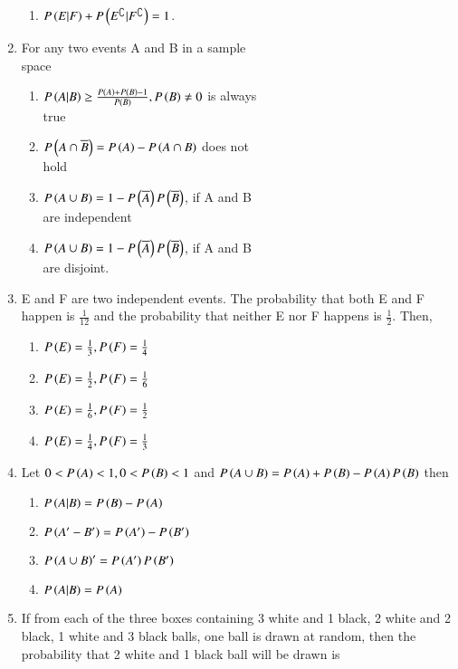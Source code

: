 \documentclass[journal,12pt,twocolumn,article]{IEEEtran}
\theoremstyle{remark}
\begin{document}
\begin{enumerate}[start = 3]
\begin{enumerate}
\item $P\left(E|F\right)+P\left(E^\complement|F^\complement\right)=1$.
\end{enumerate}
\item For any two events A and B in a sample \\space
\hfill{}
\begin{enumerate}
\item $P\left(A|B\right)\geq \frac{P\left(A\right)+P\left(B\right)-1}{P\left(B\right)}, P\left(B\right)\neq 0$ is always\\ true
\item $P\left(A\cap \overline{B}\right)=P\left(A\right)-P\left(A\cap B\right)$ does not \\hold
\item $P\left(A\cup B\right)=1-P\left(\overline{A}\right)P\left(\overline{B}\right)$, if A and B \\are independent
\item $P\left(A\cup B\right)=1-P\left(\overline{A}\right)P\left(\overline{B}\right)$, if A and B \\are disjoint.
\end{enumerate}
\item E and F are two independent events. The probability that both E and F happen is $\frac{1}{12}$ and the probability that neither E nor F happens is $\frac{1}{2}$. Then,
\hfill{}
\begin{enumerate}
\item $P\left(E\right)=\frac{1}{3},P\left(F\right)=\frac{1}{4}$
\item $P\left(E\right)=\frac{1}{2},P\left(F\right)=\frac{1}{6}$
\item $P\left(E\right)=\frac{1}{6},P\left(F\right)=\frac{1}{2}$
\item $P\left(E\right)=\frac{1}{4},P\left(F\right)=\frac{1}{3}$
\end{enumerate}
\item Let $0<P\left(A\right)<1,0<P\left(B\right)<1$ and $P\left(A\cup B\right)=P\left(A\right)+P\left(B\right)-P\left(A\right)P\left(B\right)$ then
\hfill{}
\begin{enumerate}
\item $P\left(A|B\right)=P\left(B\right)-P\left(A\right)$
\item $P\left(A'-B'\right)=P\left(A'\right)-P\left(B'\right)$
\item $P\left(A\cup B\right)'=P\left(A'\right)P\left(B'\right)$
\item $P\left(A|B\right)=P\left(A\right)$
\end{enumerate}
\item If from each of the three boxes containing 3 white and 1 black, 2 white and 2 black, 1 white and 3 black balls, one ball is drawn at random, then the probability that 2 white and 1 black ball will be drawn is

\end{enumerate}
\end{document}
